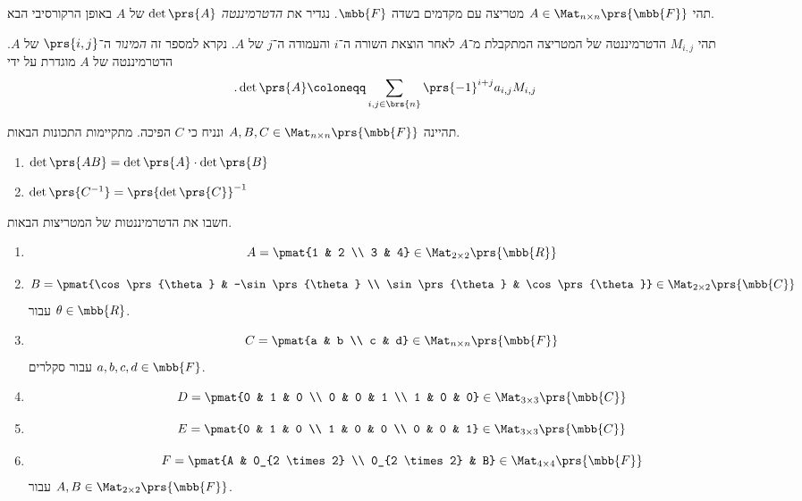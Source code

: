 \documentclass[a4paper,10pt,twoside,openany]{article}
\begin{document}
\begin{definition}[דטרמיננטה]
תהי
$A \in \Mat_{n \times n}\prs{\mbb{F}}$
מטריצה עם מקדמים בשדה
$\mbb{F}$.
נגדיר את
\emph{הדטרמיננטה}
$\det\prs{A}$
של
$A$
באופן הרקורסיבי הבא.

תהי
$M_{i,j}$
הדטרמיננטה של המטריצה המתקבלת מ־$A$ לאחר הוצאת השורה ה־$i$ והעמודה ה־$j$ של $A$.
נקרא למספר זה
\emph{המינור}
ה־$\prs{i,j}$ של
$A$.
הדטרמיננטה של
$A$
מוגדרת על ידי
\begin{align*}
\text{.} \det\prs{A} &\coloneqq \sum_{i,j \in \brs{n}} \prs{-1}^{i+j} a_{i,j} M_{i,j}
\end{align*}
\end{definition}

\begin{theorem}
תהיינה
$A, B, C \in \Mat_{n \times n}\prs{\mbb{F}}$
ונניח כי
$C$
הפיכה.
מתקיימות התכונות הבאות.
\begin{enumerate}
\item $\det\prs{AB} = \det\prs{A} \cdot \det\prs{B}$
\item $\det\prs{C^{-1}} = \prs{\det\prs{C}}^{-1}$
\end{enumerate}
\end{theorem}

\begin{exercise}\label{exercise:matrix-determinant}
חשבו את הדטרמיננטות של המטריצות הבאות.

\begin{enumerate}
\item \[A = \pmat{1 & 2 \\ 3 & 4} \in \Mat_{2 \times 2}\prs{\mbb{R}}\]
\item \[B = \pmat{\cos\prs{\theta} & -\sin\prs{\theta} \\ \sin\prs{\theta} & \cos\prs{\theta}} \in \Mat_{2 \times 2}\prs{\mbb{C}}\]
עבור
$\theta \in \mbb{R}$.
\item \[C = \pmat{a & b \\ c & d} \in \Mat_{n \times n}\prs{\mbb{F}}\]
עבור סקלרים
$a,b,c,d \in \mbb{F}$.
\item \[D = \pmat{0 & 1 & 0 \\ 0 & 0 & 1 \\ 1 & 0 & 0} \in \Mat_{3 \times 3}\prs{\mbb{C}}\]
\item \[E = \pmat{0 & 1 & 0 \\ 1 & 0 & 0 \\ 0 & 0 & 1} \in \Mat_{3 \times 3}\prs{\mbb{C}}\]
\item \[F = \pmat{A & 0_{2 \times 2} \\ 0_{2 \times 2} & B} \in \Mat_{4 \times 4}\prs{\mbb{F}}\]
עבור
$A,B \in \Mat_{2 \times 2}\prs{\mbb{F}}$.
\end{enumerate}
\end{exercise}
\end{document}
